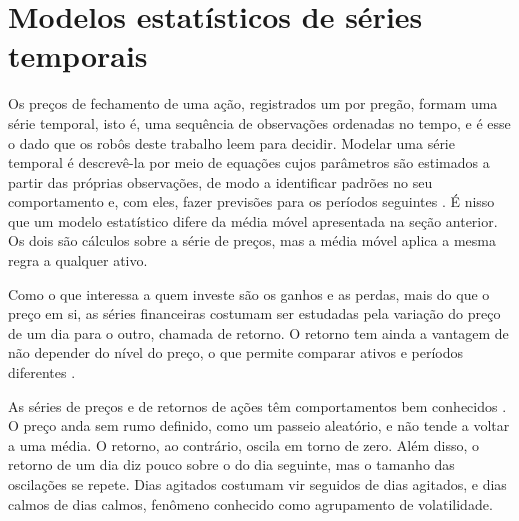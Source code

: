 \section{Modelos estatísticos de séries temporais}
\label{sec:series}

Os preços de fechamento de uma ação, registrados um por pregão, formam uma série
temporal, isto é, uma sequência de observações ordenadas no tempo, e é esse o dado
que os robôs deste trabalho leem para decidir. Modelar uma série temporal é
descrevê-la por meio de equações cujos parâmetros são estimados a partir das
próprias observações, de modo a identificar padrões no seu comportamento e, com
eles, fazer previsões para os períodos seguintes \cite{thomaz2019}. É nisso que um
modelo estatístico difere da média móvel apresentada na seção anterior. Os dois
são cálculos sobre a série de preços, mas a média móvel aplica a mesma regra a
qualquer ativo.

Como o que interessa a quem investe são os ganhos e as perdas, mais do que o preço
em si, as séries financeiras costumam ser estudadas pela variação do preço de um
dia para o outro, chamada de retorno. O retorno tem ainda a vantagem de não
depender do nível do preço, o que permite comparar ativos e períodos diferentes
\cite{thomaz2019}.

As séries de preços e de retornos de ações têm comportamentos bem conhecidos
\cite{thomaz2019}. O preço anda sem rumo definido, como um passeio aleatório, e
não tende a voltar a uma média. O retorno, ao contrário, oscila em torno de zero.
Além disso, o retorno de um dia diz pouco sobre o do dia seguinte, mas o tamanho
das oscilações se repete. Dias agitados costumam vir seguidos de dias agitados, e
dias calmos de dias calmos, fenômeno conhecido como agrupamento de volatilidade.

